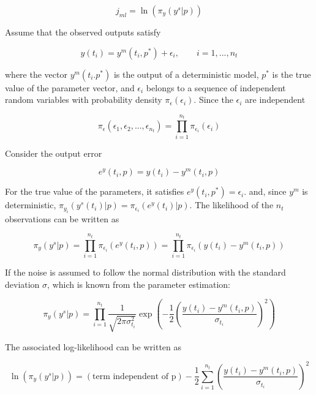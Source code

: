 \documentclass[]{scrartcl}
\begin{document}
\begin{equation}
	j_{ml} = \ln ( \pi_y (y^s|p) )
\end{equation}

Assume that the observed outputs satisfy 

\begin{equation}
	y(t_i) = y^m(t_i, p^*) + \epsilon_i, \qquad i=1,...,n_t
\end{equation}

where the vector $y^m(t_i. p^*)$ is the output of a deterministic model, $p^*$ is the true value of the parameter vector, and $\epsilon_i$ belongs to a sequence of independent random variables with probability density $\pi_{\epsilon}(\epsilon_i)$. Since the $\epsilon_i$ are independent

\begin{equation}
	\pi_{\epsilon}(\epsilon_1, \epsilon_2, ..., \epsilon_{n_t}) = \prod_{i=1}^{n_t} \pi_{\epsilon_i}(\epsilon_i)
\end{equation}

Consider the output error

\begin{equation}
	e^y(t_i, p) = y(t_i) - y^m(t_i, p)
\end{equation}

For the true value of the parameters, it satisfies $e^y(t_i, p^*)=\epsilon_i$. and, since $y^m$ is deterministic, $\pi_{y_i} (y^s(t_i)|p) = \pi_{\epsilon_i} (e^y(t_i)|p)$. The likelihood of the $n_t$ observations can be written as

\begin{equation}
	\pi_y (y^s|p) = \prod_{i=1}^{n_t} \pi_{\epsilon_i}(e^y(t_i,p)) =  \prod_{i=1}^{n_t} \pi_{\epsilon_i}(y(t_i) - y^m(t_i, p))
\end{equation}

If the noise is assumed to follow the normal distribution with the standard deviation $\sigma$, which is known from the parameter estimation:

\begin{equation}
	\pi_y (y^s|p) = \prod_{i=1}^{n_t} \frac{1}{ \sqrt{2\pi\sigma_{t_i}^2} } \exp \left( -\frac{1}{2} \left( \frac{y(t_i) - y^m(t_i, p)}{\sigma_{t_i}} \right)^2 \right)
\end{equation}

The associated log-likelihood can be written as

\begin{equation}
	\ln (\pi_y (y^s|p)) = (\text{term independent of p}) - \frac{1}{2} \sum_{i=1}^{n_t}  \left( \frac{y(t_i) - y^m(t_i, p)}{\sigma_{t_i}} \right)^2
\end{equation}
\end{document}
